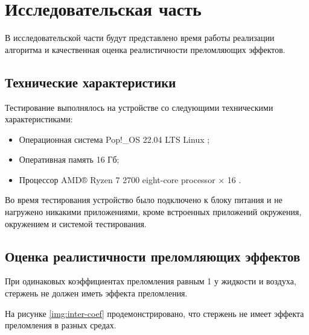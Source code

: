 \chapter{Исследовательская часть}
В исследовательской части будут представлено время работы реализации алгоритма и качественная оценка реалистичности преломляющих эффектов.
\section{Технические характеристики}
Тестирование выполнялось на устройстве со следующими техническими характеристиками:
\begin{itemize}
	\item Операционная система Pop!\_OS 22.04 LTS \cite{ubuntu} Linux \cite{linux};
	\item Оперативная память 16 Гб;
	\item Процессор AMD® Ryzen 7 2700 eight-core processor × 16 \cite{amd}.
\end{itemize}

Во время тестирования устройство было подключено к блоку питания и не нагружено никакими приложениями, кроме встроенных приложений окружения, окружением и системой тестирования.

\section{Оценка реалистичности преломляющих эффектов}

При одинаковых коэффициентах преломления равным 1 у жидкости и воздуха, стержень не должен иметь эффекта преломления.

На рисунке \ref{img:inter-coef} продемонстрировано, что стержень не имеет эффекта преломления в разных средах. 

\begin{figure}[ht!]
\end{figure}
\FloatBarrier

